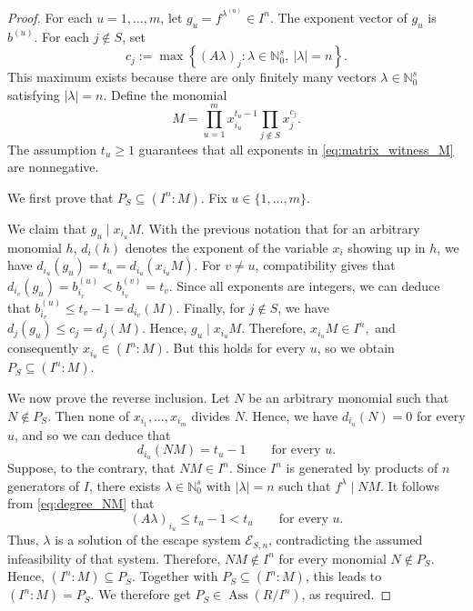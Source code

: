 \documentclass[11pt]{amsart}   %
\begin{document}
\begin{proof}
 For each $u=1,\ldots,m$, let $g_u=f^{\lambda^{(u)}}\in I^n.$ The exponent vector of $g_u$ is $b^{(u)}$.
For each $j\notin S$, set
\[c_j:=\max\left\{(A\lambda)_j:\lambda\in\mathbb N_0^s,\ |\lambda|=n\right\}.\]
This maximum exists because there are only finitely many vectors $\lambda\in\mathbb N_0^s$ satisfying $|\lambda|=n$.
 Define the monomial
\begin{equation}
M
=
\prod_{u=1}^m x_{i_u}^{t_u-1}
\prod_{j\notin S}x_j^{c_j}.
\label{eq:matrix_witness_M}
\end{equation}
The assumption $t_u\geq1$ guarantees that all exponents in \eqref{eq:matrix_witness_M} are nonnegative.

We first prove that $P_S\subseteq(I^n:M).$ Fix $u\in\{1,\ldots,m\}$. 

We claim that $g_u\mid x_{i_u}M.$ With the previous notation that for an arbitrary monomial $h$, $d_i(h)$ denotes the exponent of the variable $x_i$ showing up in $h$, we have $d_{i_u}(g_u)=t_u=d_{i_u}(x_{i_u}M)$.
For $v\neq u$, compatibility gives that $
d_{i_v}(g_u)
=
b^{(u)}_{i_v}
<
b^{(v)}_{i_v}
=
t_v.
$
Since all exponents are integers, we can deduce that $
b^{(u)}_{i_v}
\leq
t_v-1
=
d_{i_v}(M).
$
Finally, for $j\notin S$, we have $
d_j(g_u)
\leq
c_j
=
d_j(M).
$
Hence, $g_u\mid x_{i_u}M.$ Therefore, $x_{i_u}M\in I^n,$
and consequently $x_{i_u}\in(I^n:M).$ But this holds for every $u$, so we obtain
$P_S\subseteq(I^n:M).$

We now prove the reverse inclusion. Let $N$  be an arbitrary monomial such that  $N\notin P_S$.
 Then none of  $x_{i_1},\ldots,x_{i_m}$ divides $N$. Hence, we have $d_{i_u}(N)=0$
 for every $u$, and so we can deduce that
\begin{equation}
d_{i_u}(NM)
=
t_u-1
\qquad
\text{for every }u.
\label{eq:degree_NM}
\end{equation}
Suppose, to the contrary, that $NM\in I^n.$ Since $I^n$ is generated by products of $n$ generators of $I$, there
exists $\lambda\in\mathbb N_0^s$ with $|\lambda|=n$ such that  $f^\lambda\mid NM.$
It follows from \eqref{eq:degree_NM} that
\[
(A\lambda)_{i_u}
\leq
t_u-1
<
t_u
\qquad
\text{for every }u.
\]
Thus,  $\lambda$ is a solution of the escape system $\mathcal E_{S,n}$, contradicting the assumed infeasibility of that
system. Therefore, $NM\notin I^n$ for every monomial $N\notin P_S$. Hence, $(I^n:M)\subseteq P_S.$
Together with $P_S\subseteq(I^n:M)$, this leads to  $(I^n:M)=P_S.$
 We therefore get   $P_S\in\operatorname{Ass}(R/I^n)$, as required.
\end{proof}
\end{document}
